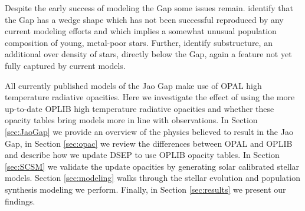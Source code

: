 Despite the early success of modeling the Gap some issues remain.
\citet{Jao2020, Jao2021} identify that the Gap has a wedge shape which has not been
successful reproduced by any current modeling efforts and which implies a
somewhat unusual population composition of young, metal-poor stars. Further,
\citet{Jao2020} identify substructure, an additional over density of stars,
directly below the Gap, again a feature not yet fully captured by current
models. 

All currently published models of the Jao Gap make use of OPAL high
temperature radiative opacities. Here we investigate the effect of using the
more up-to-date OPLIB high temperature radiative opacities and whether these
opacity tables bring models more in line with observations. In Section
\ref{sec:JaoGap} we provide an overview of the physics believed to result in the
Jao Gap, in Section \ref{sec:opac} we review the differences between OPAL
and OPLIB and describe how we update DSEP to use OPLIB opacity tables. In
Section \ref{sec:SCSM} we validate the update opacities by generating solar
calibrated stellar models. Section \ref{sec:modeling} walks through the stellar
evolution and population synthesis modeling we perform. Finally, in Section
\ref{sec:results} we present our findings. 

%

